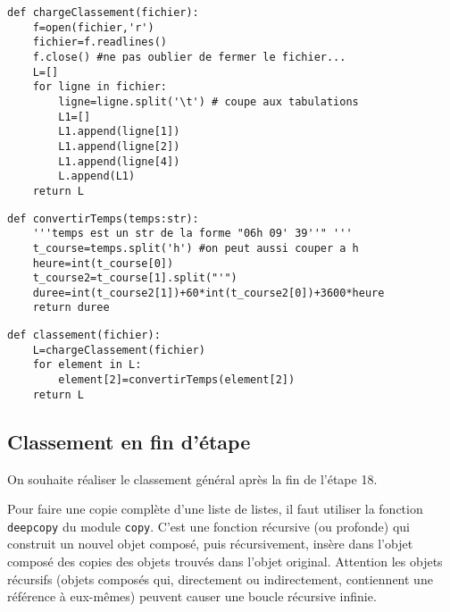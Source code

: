 \begin{lstlisting}
def chargeClassement(fichier):
    f=open(fichier,'r')
    fichier=f.readlines()
    f.close() #ne pas oublier de fermer le fichier...
    L=[]
    for ligne in fichier:
        ligne=ligne.split('\t') # coupe aux tabulations
        L1=[]
        L1.append(ligne[1])
        L1.append(ligne[2])
        L1.append(ligne[4])
        L.append(L1)
    return L
\end{lstlisting}


\begin{lstlisting}
def convertirTemps(temps:str):
    '''temps est un str de la forme "06h 09' 39''" '''
    t_course=temps.split('h') #on peut aussi couper a h
    heure=int(t_course[0])
    t_course2=t_course[1].split("'")
    duree=int(t_course2[1])+60*int(t_course2[0])+3600*heure
    return duree
\end{lstlisting}



\begin{lstlisting}
def classement(fichier):
    L=chargeClassement(fichier)
    for element in L:
        element[2]=convertirTemps(element[2])
    return L
\end{lstlisting}



\subsection*{Classement en fin d'étape}


On souhaite réaliser le classement général après la fin de l'étape 18.

\begin{rem}
Pour faire une copie complète d'une liste de listes, il faut utiliser la fonction \texttt{deepcopy} du module \texttt{copy}. C'est une fonction récursive (ou profonde) qui construit un nouvel objet composé, puis récursivement, insère dans l'objet composé des copies des objets trouvés dans l'objet original. Attention les objets récursifs (objets composés qui, directement ou indirectement, contiennent une référence à eux-mêmes) peuvent causer une boucle récursive infinie.
\end{rem}

